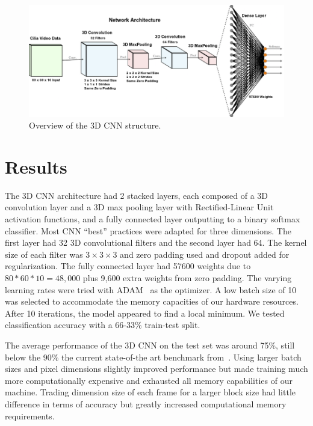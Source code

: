 \begin{figure}
\includegraphics[scale=1.2]{arch}
\caption{Overview of the 3D CNN structure.}
\end{figure}

\section{Results}

The 3D CNN architecture had 2 stacked layers, each composed of a 3D convolution layer and a 3D max pooling layer with Rectified-Linear Unit \cite{nair2010rectified} activation functions, and a fully connected layer outputting to a binary softmax classifier. Most CNN ``best'' practices \cite{goodfellow_bengio_courville_2016} were adapted for three dimensions. The first layer had 32 3D convolutional filters and the second layer had 64. The kernel size of each filter was $3 \times 3 \times 3$ and zero padding used and dropout \cite{srivastava2014dropout} added for regularization. The fully connected layer had 57600 weights due to $80 * 60 * 10 = 48,000$ plus 9,600 extra weights from zero padding. The varying learning rates were tried with ADAM~\cite{kingma2014adam} as the optimizer. A low batch size of 10 was selected to accommodate the memory capacities of our hardware resources. After 10 iterations, the model appeared to find a local minimum. We tested classification accuracy with a 66-33\% train-test split. 

The average performance of the 3D CNN on the test set was around 75\%, still below the 90\% the current state-of-the art benchmark from~\cite{quinn2015automated}. Using larger batch sizes and pixel dimensions slightly improved performance but made training much more computationally expensive and exhausted all memory capabilities of our machine. Trading dimension size of each frame for a larger block size had little difference in terms of accuracy but greatly increased computational memory requirements.  

